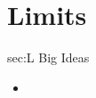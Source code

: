 \chapter{Limits}
\label{chap:L}

\begin{bigideas}{sec:L Big Ideas}
\begin{itemize}
  \item 
\end{itemize}
\end{bigideas}
